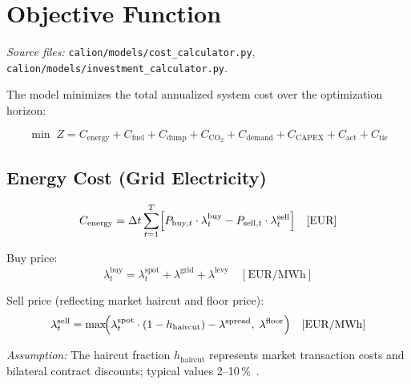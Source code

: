 \documentclass[a4paper,12pt]{article}
\begin{document}
\section{Objective Function}
\label{sec:objective}

\textit{Source files:} \texttt{calion/models/cost\_calculator.py},
\texttt{calion/models/investment\_calculator.py}.

The model minimizes the total annualized system cost over the optimization horizon:

\begin{equation}
  \min \; Z = C_{\text{energy}} + C_{\text{fuel}} + C_{\text{dump}}
             + C_{\text{CO}_2} + C_{\text{demand}}
             + C_{\text{CAPEX}} + C_{\text{act}} + C_{\text{tie}}
  \label{eq:objective}
\end{equation}

\subsection{Energy Cost (Grid Electricity)}

\begin{equation}
  C_{\text{energy}}
  = \Delta t \sum_{t=1}^{T}
    \Bigl[ P_{\text{buy},t} \cdot \lambda^{\text{buy}}_{t}
          - P_{\text{sell},t} \cdot \lambda^{\text{sell}}_{t} \Bigr]
  \quad [\text{EUR}]
  \label{eq:energy-cost}
\end{equation}

\noindent Buy price:
\begin{equation}
  \lambda^{\text{buy}}_{t}
  = \lambda^{\text{spot}}_{t} + \lambda^{\text{grid}} + \lambda^{\text{levy}}
  \quad [\text{EUR/MWh}]
  \label{eq:buy-price}
\end{equation}

\noindent Sell price (reflecting market haircut and floor price):
\begin{equation}
  \lambda^{\text{sell}}_{t}
  = \max\!\Bigl(
      \lambda^{\text{spot}}_{t} \cdot (1 - h_{\text{haircut}})
      - \lambda^{\text{spread}},\;
      \lambda^{\text{floor}}
    \Bigr)
  \quad [\text{EUR/MWh}]
  \label{eq:sell-price}
\end{equation}

\noindent\textit{Assumption:} The haircut fraction $h_{\text{haircut}}$ represents market
transaction costs and bilateral contract discounts; typical values 2–10\,\%~\cite{Kirschen2018}.
\end{document}

